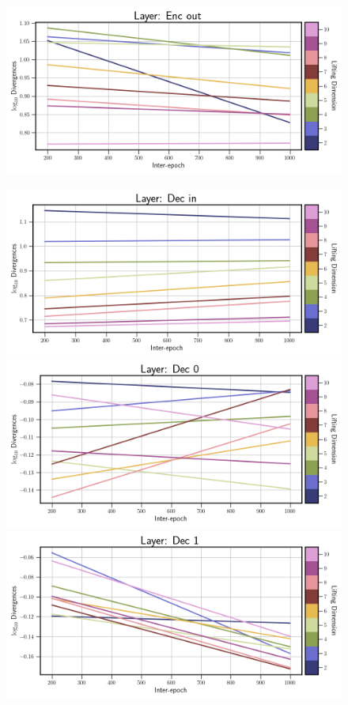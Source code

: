 \begin{figure}[!htbp]
\begin{minipage}{.5\textwidth}
        \includegraphics[width=\textwidth]{"../Figures/van_der_pol_div_plot_linear_enc_out.png"} 
    \end{minipage}%
    \begin{minipage}{.5\textwidth}
        \includegraphics[width=\textwidth]{"../Figures/van_der_pol_div_plot_linear_dec_in.png"} 
        \includegraphics[width=\textwidth]{"../Figures/van_der_pol_div_plot_linear_dec_0.png"} 
        \includegraphics[width=\textwidth]{"../Figures/van_der_pol_div_plot_linear_dec_1.png"} 

\end{minipage}
\end{figure}
